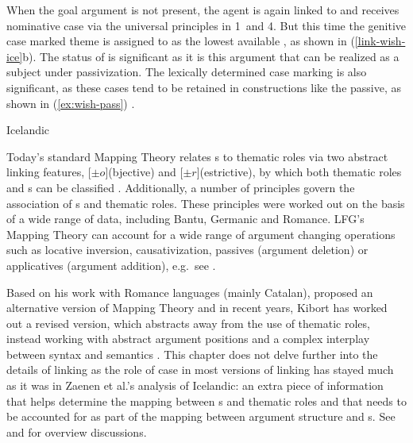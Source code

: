 \documentclass[output=paper,hidelinks]{langscibook}
\begin{document}
When the goal argument is not present, the agent is again linked to
\SUBJ and receives nominative case via the universal principles in 1~and 4.
But this time the genitive case marked theme is assigned to \OBJ as the lowest
available {\GF}, as shown in (\ref{link-wish-ice}b).  The status of \OBJ is
significant as it is this argument that can be realized as a subject under
passivization. The lexically determined case marking is also significant, as
these cases tend to be retained in constructions like the passive, as shown in
(\ref{ex:wish-pass}) \citep[471]{ZMT85:Case}.


\begin{exe}
  \ex \label{ex:wish-pass} Icelandic 
  \begin{xlist}
      \end{xlist}
    \end{exe}
    


    Today's standard Mapping Theory relates {\GF}s to thematic roles via two
    abstract linking features, [$\pm o$](bjective) and [$\pm r$](estrictive), by
    which both thematic roles and {\GF}s can be classified
    \citep{bresnanzaenen90,bresnan2001lexical,Butt2006}.  Additionally, a number of
    principles govern the association of {\GF}s and thematic roles.  These
    principles were worked out on the basis of a wide range of data, including
    Bantu, Germanic and Romance. LFG's Mapping Theory can account for a wide
    range of argument changing operations such as locative inversion,
    causativization, passives (argument deletion) or applicatives (argument
    addition), e.g.~see
    \citet{levin87,AlsinaMchombo:Appl,bresnan1989locative,BresMosh90,alsinajoshi91}.


    Based on his work
    with Romance languages (mainly Catalan), \citet{alsina1996the-role} proposed
    an alternative version of Mapping Theory and in recent years, Kibort has worked out
    a revised version, which abstracts away from the use of thematic roles,
    instead working with abstract argument positions and a complex interplay
    between syntax and semantics \citep{Kibort2007,kibort13,kibort14,KM15}.  This
      chapter does not delve further into the details of linking as the role of
      case in most versions of linking has stayed much as it was in Zaenen et
      al.'s analysis of Icelandic: an extra piece of information that helps
      determine the mapping between {\GF}s and thematic roles and that needs to be
      accounted for as part of the mapping between argument structure and
      {{\GF}}s. See \citet{Butt2006} and 
    for  overview discussions. 
\end{document}
